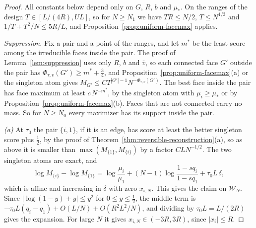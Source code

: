 \begin{proof}
All constants below depend only on $G$, $R$, $b$ and $\mu_*$. On the ranges of
the design $T\in[L/(4R),UL]$, so for $N\ge N_1$ we have $TR\le N/2$,
$T\le N^{1/3}$ and $1/T+T^2/N\le5R/L$, and
Proposition~\ref{prop:uniform-facemax} applies.

\emph{Suppression.} Fix a pair and a point of the ranges, and let $m^*$ be the
least score among the irreducible faces inside the pair. The proof of
Lemma~\ref{lem:suppression} uses only $R$, $b$ and $\bar v$, so each connected
face $G'$ outside the pair has $\Phi_{\tau,v}(G')\ge m^*+\frac34$, and
Proposition~\ref{prop:uniform-facemax}(a) or the singleton atom gives
$M_{G'}\le CT^{|G'|-1}N^{-\Phi_{\tau,v}(G')}$. The best face inside the pair has
face maximum at least $c\,N^{-m^*}$, by the singleton atom with $\mu_i\ge\mu_*$
or by Proposition~\ref{prop:uniform-facemax}(b). Faces that are not connected
carry no mass. So for $N\ge N_0$ every maximizer has its support inside the
pair.

\emph{(a)} At $\tau_0$ the pair $\{i,1\}$, if it is an edge, has score at least
the better singleton score plus $\frac12$, by the proof of
Theorem~\ref{thm:reversible-reconstruction}(a), so as above it is smaller than
$\max(M_{\{1\}},M_{\{i\}})$ by a factor $CLN^{-1/2}$. The two singleton
atoms are exact, and
\[
 \log M_{\{i\}}-\log M_{\{1\}}=\log\frac{\mu_i}{\mu_1}+(N-1)\log\frac{1-sq_i}{1-sq_1}+\tau_0L\,\delta ,
\]
which is affine and increasing in $\delta$ with zero $x_{i,N}$. This gives the
claim on $\mathcal W_N$. Since $|\log(1-y)+y|\le y^2$ for $0\le y\le\frac12$,
the middle term is $-\tau_0L(q_i-q_1)+O(L/N)+O(R^2L^2/N)$, and dividing by
$\tau_0L=L/(2R)$ gives the expansion. For large $N$ it gives
$x_{i,N}\in(-3R,3R)$, since $|x_i|\le R$.


\end{proof}
